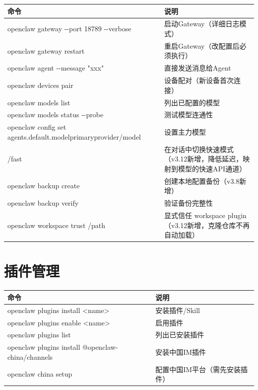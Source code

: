 \documentclass[
  10
]{article}
\newcounter{none} %
\begin{document}
{\def\LTcaptype{none} %
\begin{longtable}[]{@{}|l|l|@{}}
\toprule\noalign{}
\endhead
\bottomrule\noalign{}
\endlastfoot
\hline
命令 & 说明 \\
\hline
openclaw gateway -\/-port 18789 -\/-verbose &
启动Gateway（详细日志模式） \\
\hline
openclaw gateway restart & 重启Gateway（改配置后必须执行） \\
\hline
openclaw agent -\/-message "xxx" & 直接发送消息给Agent \\
\hline
openclaw devices pair & 设备配对（新设备首次连接） \\
\hline
openclaw models list & 列出已配置的模型 \\
\hline
openclaw models status -\/-probe & 测试模型连通性 \\
\hline
openclaw config set agents.default.modelprimaryprovider/model &
设置主力模型 \\
\hline
/fast &
在对话中切换快速模式（v3.12新增，降低延迟，映射到模型的快速API通道） \\
\hline
openclaw backup create & 创建本地配置备份（v3.8新增） \\
\hline
openclaw backup verify & 验证备份完整性 \\
\hline
openclaw workspace trust /path & 显式信任 workspace
plugin（v3.12新增，克隆仓库不再自动加载） \\
\hline
\end{longtable}
}

\section{插件管理}\label{ux63d2ux4ef6ux7ba1ux7406}

{\def\LTcaptype{none} %
\begin{longtable}[]{@{}|l|l|@{}}
\toprule\noalign{}
\endhead
\bottomrule\noalign{}
\endlastfoot
\hline
命令 & 说明 \\
\hline
openclaw plugins install \textless name\textgreater{} &
安装插件/Skill \\
\hline
openclaw plugins enable \textless name\textgreater{} & 启用插件 \\
\hline
openclaw plugins list & 列出已安装插件 \\
\hline
openclaw plugins install @openclaw-china/channels & 安装中国IM插件 \\
\hline
openclaw china setup & 配置中国IM平台（需先安装插件） \\
\hline
\end{longtable}
}
\end{document}

